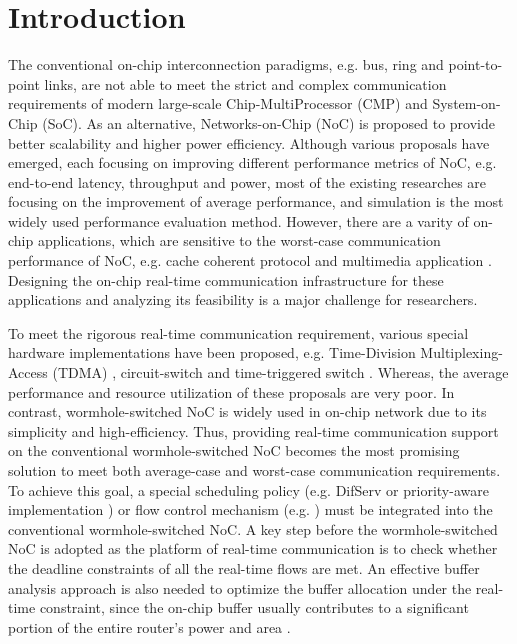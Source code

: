 \documentclass[preprint]{elsarticle}
\begin{document}
\linenumbers

\section{Introduction}
The conventional on-chip interconnection paradigms, e.g. bus, ring and point-to-point links, are not able to meet the strict and complex communication requirements of modern large-scale Chip-MultiProcessor (CMP) and System-on-Chip (SoC). As an alternative, Networks-on-Chip (NoC) is proposed to provide better scalability and higher power efficiency. Although various proposals have emerged, each focusing on improving different performance metrics of NoC, e.g. end-to-end latency, throughput and power, most of the existing researches are focusing on the improvement of average performance, and simulation is the most widely used performance evaluation method. However, there are a varity of on-chip applications, which are sensitive to the worst-case communication performance of NoC, e.g. cache coherent protocol \cite{Bolotin2007} and multimedia application \cite{ostermann2004video}. Designing the on-chip real-time communication infrastructure for these applications and analyzing its feasibility is a major challenge for researchers.

To meet the rigorous real-time communication requirement, various special hardware implementations have been proposed, e.g. Time-Division Multiplexing-Access (TDMA) \cite{GoDR05}, circuit-switch \cite{6628254} and time-triggered switch \cite{4617280}. Whereas, the average performance and resource utilization of these proposals are very poor. In contrast, wormhole-switched NoC is widely used in on-chip network due to its simplicity and high-efficiency. Thus, providing real-time communication support on the conventional wormhole-switched NoC becomes the most promising solution to meet both average-case and worst-case communication requirements. To achieve this goal, a special scheduling policy (e.g. DifServ \cite{1411140} or priority-aware implementation \cite{Shi:2008:RCA:1397757.1397996,708526,627905}) or flow control mechanism (e.g. \cite{Li199649,707545}) must be integrated into the conventional wormhole-switched NoC. A key step before the wormhole-switched NoC is adopted as the platform of real-time communication is to check whether the deadline constraints of all the real-time flows are met. An effective buffer analysis approach is also needed to optimize the buffer allocation under the real-time constraint, since the on-chip buffer usually contributes to a significant portion of the entire router's power and area \cite{pkundu,5507566}.
\end{document}
